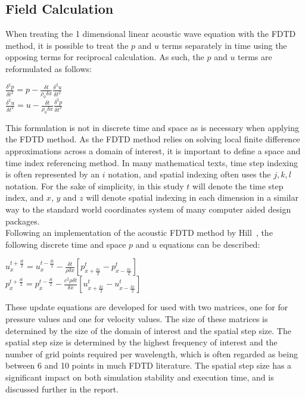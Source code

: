 \subsection{Field Calculation}
When treating the 1 dimensional linear acoustic wave equation with the FDTD method, it is possible to treat the $p$ and $u$ terms separately in time using the opposing terms for reciprocal calculation. As such, the $p$ and $u$ terms are reformulated as follows:\\
\begin{center}
$\frac{\delta^2 p}{\delta t^2} = p - \frac{\delta t}{\rho_0 \delta x} \frac{\delta^2 u}{\delta t^{2}}$\\
$\frac{\delta^2 u}{\delta t^2} = u - \frac{\delta t}{\rho_0 \delta x} \frac{\delta^2 p}{\delta t^{2}}$\\
\end{center}
This formulation is not in discrete time and space as is necessary when applying the FDTD method. As the FDTD method relies on solving local finite difference approximations across a domain of interest, it is important to define a space and time index referencing method. In many mathematical texts, time step indexing is often represented by an $i$ notation, and spatial indexing often uses the $j,k,l$ notation. For the sake of simplicity, in this study $t$ will denote the time step index, and $x$, $y$ and $z$ will denote spatial indexing in each dimension in a similar way to the standard world coordinates system of many computer aided design packages.\\
Following an implementation of the acoustic FDTD method by Hill~\cite{Hill2012}, the following discrete time and space $p$ and $u$ equations can be described:\\
\begin{center}
$u^{t + \frac{\delta t}{2}}_{x} = u^{t - \frac{\delta t}{2}}_{x} - \frac{\delta t}{\rho \delta x} \left[p^{t}_{x + \frac{\delta x}{2}} - p^{t}_{x - \frac{\delta x}{2}}\right]$\\
$p^{t + \frac{\delta t}{2}}_{x} = p^{t - \frac{\delta t}{2}}_{x} - \frac{c^2 \rho \delta t}{\delta x} \left[u^{t}_{x + \frac{\delta x}{2}} - u^{t}_{x - \frac{\delta x}{2}}\right]$\\
\end{center}
These update equations are developed for used with two matrices, one for for pressure values and one for velocity values. The size of these matrices is determined by the size of the domain of interest and the spatial step size. The spatial step size is determined by the highest frequency of interest and the number of grid points required per wavelength, which is often regarded as being between 6 and 10 points in much FDTD literature. The spatial step size has a significant impact on both simulation stability and execution time, and is discussed further in the report.
